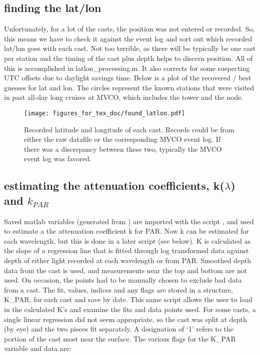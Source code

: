 \documentclass[11pt]{article}
\begin{document}
\subsection{finding the lat/lon}

Unfortunately, for a lot of the casts, the position was not entered or recorded. So, this means we have to check it against the event log and sort out which recorded lat/lon goes with each cast. Not too terrible, as there will be typically be one cast per station and the timing of the cast plus depth helps to discern position. All of this is accomplished in latlon\_processing.m. It also corrects for some suspecting UTC offsets due to daylight savings time.
Below is a plot of the recovered / best guesses for lat and lon. The circles represent the known stations that were visited in past all-day long cruises at MVCO, which includes the tower and the node.

 \begin{figure}[h]
\centering
\texttt{[image: figures\_for\_tex\_doc/found\_latlon.pdf]}
\caption{Recorded latitude and longitude of each cast. Records could be from either the raw datafile or the corresponding MVCO event log. If there was a discrepancy between these two, typically the MVCO event log was favored.}
\end{figure}

\clearpage

\subsection{estimating the attenuation coefficients, k($\lambda$) and $k_{PAR}$}

Saved matlab variables (generated from ) are imported with the script , and used to estimate a the attenuation coefficient k for PAR. Now k can be estimated for each wavelength, but this is done in a later script (see below). K is calculated as the slope of a regression line that is fitted through log transformed data against depth of either light recorded at each wavelength or from PAR.  Smoothed depth data from the cast is used, and measurements near the top and bottom are not used. On occasion, the points had to be manually chosen to exclude bad data from a cast. The fit, values, indices and any flags are stored in a structure, K\_PAR, for each cast and save by date. This same script allows the user to load in the calculated K's and examine the fits and data points used. For some casts, a single linear regression did not seem appropriate, so the cast was split at depth (by eye) and the two pieces fit separately. A designation of `1' refers to the portion of the cast most near the surface. The various flags for the K\_PAR variable and data are:
\end{document}
